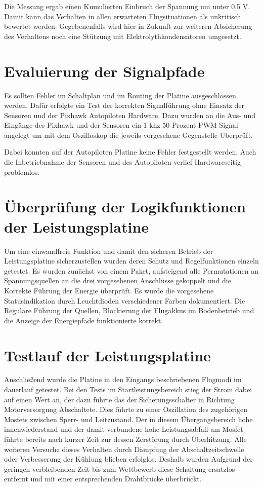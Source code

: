 Die Messung ergab einen Kumulierten Einbruch der Spannung um unter 0,5 V. 
Damit kann das Verhalten in allen erwarteten Flugsituationen als unkritisch bewertet werden. Gegebenenfalls wird hier in Zukunft zur weiteren Absicherung des Verhaltens noch eine Stützung mit Elektrolythkondensatoren umgesetzt. 

\section{Evaluierung der Signalpfade}

Es sollten Fehler im Schaltplan und im Routing der Platine ausgeschlossen werden. Dafür erfolgte ein Test der korrekten Signalführung ohne Einsatz der Sensoren und der Pixhawk Autopiloten Hardware. Dazu wurden an die Aus- und Eingänge des Pixhawk und der Sensoren ein 1 khz 50 Prozent PWM Signal angelegt um mit dem Oszilloskop die jeweils vorgesehene Gegenstelle Überprüft.

Dabei konnten auf der Autopiloten Platine keine Fehler festgestellt werden.
Auch die Inbetriebnahme der Sensoren und des Autopiloten verlief Hardwareseitig problemlos.

\section{Überprüfung der Logikfunktionen der Leistungsplatine}

Um eine einwandfreie Funktion und damit den sicheren Betrieb der Leistungsplatine sicherzustellen wurden deren Schutz und Regelfunktionen einzeln getestet.
Es wurden zunächst von einem Paket, aufsteigend alle Permutationen an Spannungsquellen an die drei vorgesehenen Anschlüsse gekoppelt und die Korrekte Führung der Energie überprüft.
Es wurde die vorgesehene Statusindikation durch Leuchtdioden verschiedener Farben dokumentiert.
Die Reguläre Führung der Quellen, Blockierung der Flugakkus im Bodenbetrieb und die Anzeige der Energiepfade funktionierte korrekt.

\section{Testlauf der Leistungsplatine}

Anschließend wurde die Platine in den Eingangs beschriebenen Flugmodi im dauerlauf getestet.
Bei den Tests im Startleistungsbereich stieg der Strom dabei auf einen Wert an, der dazu führte das der Sicherungsschalter in Richtung Motorversorgung Abschaltete.
Dies führte zu einer Oszillation des zugehörigen Mosfets zwischen Sperr- und Leitzustand. Der in diesem Übergangsbereich hohe innenwiederstand und der damit verbundene hohe Leistungsabfall am Mosfet führte bereits nach kurzer Zeit zur dessen Zerstörung durch Überhitzung.
Alle weiteren Versuche dieses Verhalten durch Dämpfung der Abschaltzeitschwelle oder Verbesserung der Kühlung blieben erfolglos. Deshalb wurden Aufgrund der geringen verbleibenden Zeit bis zum Wettbewerb diese Schaltung ersatzlos entfernt und mit einer entsprechenden Drahtbrücke überbrückt.